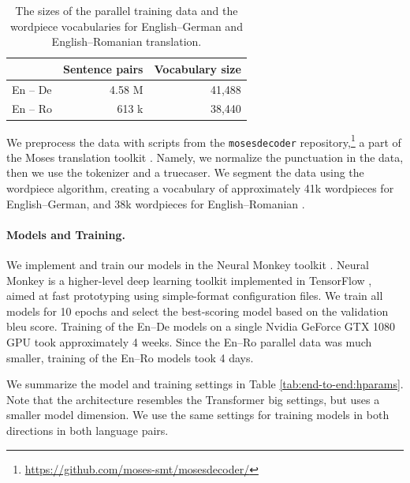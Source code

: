 \begin{table}
  \centering
  \begin{tabular}{lrr}
    \toprule
     & Sentence pairs & Vocabulary size \\
    \midrule
    En -- De & 4.58 M & 41,488 \\
    En -- Ro & 613 k & 38,440 \\
    \bottomrule
  \end{tabular}

  \caption{The sizes of the parallel training data and the wordpiece
    vocabularies for English--German and English--Romanian translation.}%
  \label{tab:end-to-end:data}
\end{table}

We preprocess the data with scripts from the \texttt{mosesdecoder}
repository,\footnote{\url{https://github.com/moses-smt/mosesdecoder/}} a part
of the Moses translation toolkit \citep{koehn-etal-2007-moses}. Namely, we
normalize the punctuation in the data, then we use the tokenizer and a
truecaser. We segment the data using the wordpiece algorithm, creating a
vocabulary of approximately 41k wordpieces for English--German, and 38k
wordpieces for English--Romanian \citep{wu2016google}.

\paragraph{Models and Training.}
We implement and train our models in the Neural Monkey toolkit
\citep{helcl-libovicky-2017-neural,helcl-etal-2018-neural}. Neural Monkey is a
higher-level deep learning toolkit implemented in TensorFlow
\citep{tensorflow2015-whitepaper}, aimed at fast prototyping using
simple-format configuration files. We train all models for 10 epochs and select
the best-scoring model based on the validation \acs{bleu} score. Training of
the En--De models on a single Nvidia GeForce GTX 1080 GPU took approximately 4
weeks. Since the En--Ro parallel data was much smaller, training of the En--Ro
models took 4 days.

We summarize the model and training settings in Table
\ref{tab:end-to-end:hparams}. Note that the architecture resembles the
Transformer big settings, but uses a smaller model dimension. We use the same
settings for training models in both directions in both language pairs.

